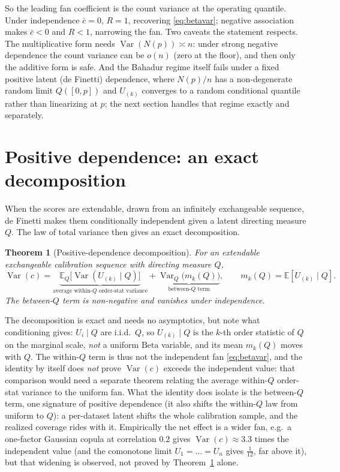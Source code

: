 \documentclass[11pt]{article}
\newtheorem{theorem}{Theorem}
\begin{document}
So the leading fan coefficient is the count variance at the operating quantile. Under
independence $\bar c=0$, $R=1$, recovering \eqref{eq:betavar}; negative association makes $\bar c<0$
and $R<1$, narrowing the fan. Two caveats the statement respects. The multiplicative form needs
$\operatorname{Var}(N(p))\asymp n$: under strong negative dependence the count variance can be
$o(n)$ (zero at the floor), and then only the additive form is safe. And the Bahadur regime itself
fails under a fixed positive latent (de Finetti) dependence, where $N(p)/n$ has a non-degenerate
random limit $Q([0,p])$ and $U_{(k)}$ converges to a random conditional quantile rather than
linearizing at $p$; the next section handles that regime exactly and separately.

\section{Positive dependence: an exact decomposition}

When the scores are extendable, drawn from an infinitely exchangeable sequence, de Finetti
\citep{definetti1937,kerns2006} makes them conditionally independent given a latent directing measure
$Q$. The law of total variance then gives an exact decomposition.

\begin{theorem}[Positive-dependence decomposition]\label{thm:pos}
For an extendable exchangeable calibration sequence with directing measure $Q$,
\begin{equation}
\operatorname{Var}(c)=\underbrace{\mathbb E_Q\!\big[\operatorname{Var}(U_{(k)}\mid Q)\big]}
_{\text{average within-}Q\text{ order-stat variance}}
+\underbrace{\operatorname{Var}_Q\!\big(m_k(Q)\big)}_{\text{between-}Q\text{ term}},
\qquad m_k(Q)=\mathbb E[U_{(k)}\mid Q].
\end{equation}
The between-$Q$ term is non-negative and vanishes under independence.
\end{theorem}

The decomposition is exact and needs no asymptotics, but note what conditioning gives: $U_i\mid Q$ are
i.i.d.\ $Q$, so $U_{(k)}\mid Q$ is the $k$-th order statistic of $Q$ on the marginal scale, \emph{not}
a uniform $\mathrm{Beta}$ variable, and its mean $m_k(Q)$ moves with $Q$. The within-$Q$ term is thus
not the independent fan \eqref{eq:betavar}, and the identity by itself does \emph{not} prove
$\operatorname{Var}(c)$ exceeds the independent value: that comparison would need a separate theorem
relating the average within-$Q$ order-stat variance to the uniform fan. What the identity does isolate
is the between-$Q$ term, one signature of positive dependence (it also shifts the within-$Q$ law from
uniform to $Q$): a per-dataset latent shifts the whole
calibration sample, and the realized coverage rides with it. Empirically the net effect is a wider
fan, e.g.\ a one-factor Gaussian copula at correlation $0.2$ gives $\operatorname{Var}(c)\approx 3.3$
times the independent value (and the comonotone limit $U_1=\dots=U_n$ gives $\tfrac1{12}$, far above
it), but that widening is observed, not proved by Theorem~\ref{thm:pos} alone.
\end{document}
